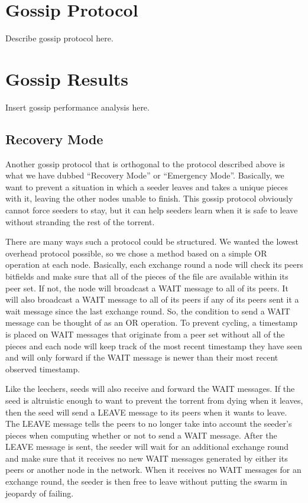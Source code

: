 \section{Gossip Protocol}

Describe gossip protocol here.

\section{Gossip Results}

Insert gossip performance analysis here.

\subsection{Recovery Mode}

Another gossip protocol that is orthogonal to the protocol described above is 
what we have dubbed ``Recovery Mode'' or ``Emergency Mode''. Basically, we
want to prevent a situation in which a seeder leaves and takes a unique pieces
with it, leaving the other nodes unable to finish. This gossip protocol obviously
cannot force seeders to stay, but it can help seeders learn when it is safe to
leave without stranding the rest of the torrent. 

There are many ways such a protocol could be structured. We wanted the lowest
overhead protocol possible, so we chose a method based on a simple OR operation
at each node. Basically, each exchange round a node will check its peers bitfields
and make sure that all of the pieces of the file are available within its peer
set. If not, the node will broadcast a WAIT message to all of its peers. It will
also broadcast a WAIT message to all of its peers if any of its peers sent it a 
wait message since the last exchange round. So, the condition to send a WAIT message 
can be thought of as an OR operation. To prevent cycling, a timestamp is placed
on WAIT messages that originate from a peer set without all of the pieces and each
node will keep track of the most recent timestamp they have seen and will only forward if
the WAIT message is newer than their most recent observed timestamp.

Like the leechers, seeds will also receive and forward the WAIT messages. If the 
seed is altruistic enough to want to prevent the torrent from dying when it leaves,
then the seed will send a LEAVE message to its peers when it wants to leave. The LEAVE
message tells the peers to no longer take into account the seeder's pieces when computing
whether or not to send a WAIT message. After the LEAVE message is sent, the seeder will
wait for an additional exchange round and make sure that it receives no new WAIT messages
generated by either its peers or another node in the network. When it receives no WAIT
messages for an exchange round, the seeder is then free to leave without putting the 
swarm in jeopardy of failing. 


